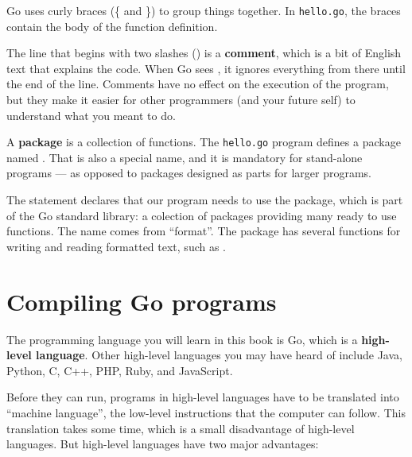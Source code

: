
Go uses curly braces (\{ and \}) to group things together.
In {\tt hello.go}, the braces contain the body of the function definition.


The line that begins with two slashes (\java{//}) is a {\bf comment}, which is a bit of English text that explains the code.
When Go sees \java{//}, it ignores everything from there until the end of the line.
Comments have no effect on the execution of the program, but they make it easier for other programmers (and your future self) to understand what you meant to do.



A {\bf package} is a collection of functions.
The {\tt hello.go} program defines a package named . That is also a special name, and it is mandatory for stand-alone programs
--- as opposed to packages designed as parts for larger programs. 


The  statement declares that our program needs to use the  package, which is part of the Go standard library: a colection of packages providing many ready to use functions. The  name comes from ``format''. The  package has several functions for writing and reading formatted text, such as .


\section{Compiling Go programs}


The programming language you will learn in this book is Go, which is a {\bf high-level language}.
Other high-level languages you may have heard of include Java, Python, C, C++, PHP, Ruby, and JavaScript.


Before they can run, programs in high-level languages have to be translated into ``machine language'', the low-level instructions that the computer can follow.
This translation takes some time, which is a small disadvantage of high-level languages.
But high-level languages have two major advantages:

